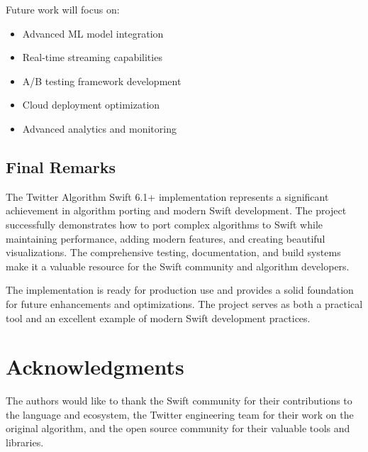 \documentclass[11pt,a4paper]{article}
\begin{document}
Future work will focus on:

\begin{itemize}
    \item Advanced ML model integration
    \item Real-time streaming capabilities
    \item A/B testing framework development
    \item Cloud deployment optimization
    \item Advanced analytics and monitoring
\end{itemize}

\subsection{Final Remarks}

The Twitter Algorithm Swift 6.1+ implementation represents a significant achievement in algorithm porting and modern Swift development. The project successfully demonstrates how to port complex algorithms to Swift while maintaining performance, adding modern features, and creating beautiful visualizations. The comprehensive testing, documentation, and build systems make it a valuable resource for the Swift community and algorithm developers.

The implementation is ready for production use and provides a solid foundation for future enhancements and optimizations. The project serves as both a practical tool and an excellent example of modern Swift development practices.

\section*{Acknowledgments}

The authors would like to thank the Swift community for their contributions to the language and ecosystem, the Twitter engineering team for their work on the original algorithm, and the open source community for their valuable tools and libraries.



\end{document}
